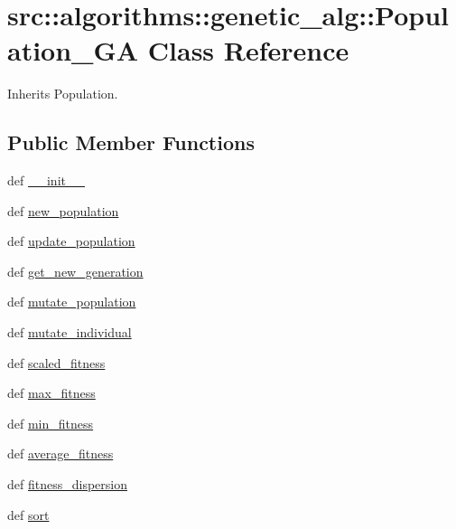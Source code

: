 \hypertarget{classsrc_1_1algorithms_1_1genetic__alg_1_1Population__GA}{
\section{src::algorithms::genetic\_\-alg::Population\_\-GA Class Reference}
\label{classsrc_1_1algorithms_1_1genetic__alg_1_1Population__GA}
}


Inherits Population.

\subsection*{Public Member Functions}
\begin{DoxyCompactItemize}
\item 
def \hyperlink{classsrc_1_1algorithms_1_1genetic__alg_1_1Population__GA_a1cccababdfce60e00e94e22c610148c0}{\_\-\_\-init\_\-\_\-}
\item 
def \hyperlink{classsrc_1_1algorithms_1_1genetic__alg_1_1Population__GA_a8c86a85bf8ef8cb21e38ce471acca6ff}{new\_\-population}
\item 
def \hyperlink{classsrc_1_1algorithms_1_1genetic__alg_1_1Population__GA_abb96e126611c8b98a26bad8f4dfb2b00}{update\_\-population}
\item 
def \hyperlink{classsrc_1_1algorithms_1_1genetic__alg_1_1Population__GA_a6bc2cdc4c2ae68df504ec3ef3a24a48b}{get\_\-new\_\-generation}
\item 
def \hyperlink{classsrc_1_1algorithms_1_1genetic__alg_1_1Population__GA_adb33181bb3b46e1679df78669613d3ba}{mutate\_\-population}
\item 
def \hyperlink{classsrc_1_1algorithms_1_1genetic__alg_1_1Population__GA_ad857b29aef47f4d7f4a876c4c53acad7}{mutate\_\-individual}
\item 
def \hyperlink{classsrc_1_1algorithms_1_1genetic__alg_1_1Population__GA_a44c9c7690772ea28648705efb658a2d9}{scaled\_\-fitness}
\item 
def \hyperlink{classsrc_1_1algorithms_1_1genetic__alg_1_1Population__GA_a21755c162ec0e7a06e9323e0698e2867}{max\_\-fitness}
\item 
def \hyperlink{classsrc_1_1algorithms_1_1genetic__alg_1_1Population__GA_a303f3f2c571137a7013e459aab5e18bb}{min\_\-fitness}
\item 
def \hyperlink{classsrc_1_1algorithms_1_1genetic__alg_1_1Population__GA_a192c94ef64823bd720c46ffe6d1c5596}{average\_\-fitness}
\item 
def \hyperlink{classsrc_1_1algorithms_1_1genetic__alg_1_1Population__GA_a8e7cafde9d8bcffb2b24dcc033a0f2a1}{fitness\_\-dispersion}
\item 
def \hyperlink{classsrc_1_1algorithms_1_1genetic__alg_1_1Population__GA_a08d0176e18c0996617731399460e1994}{sort}
\end{DoxyCompactItemize}


